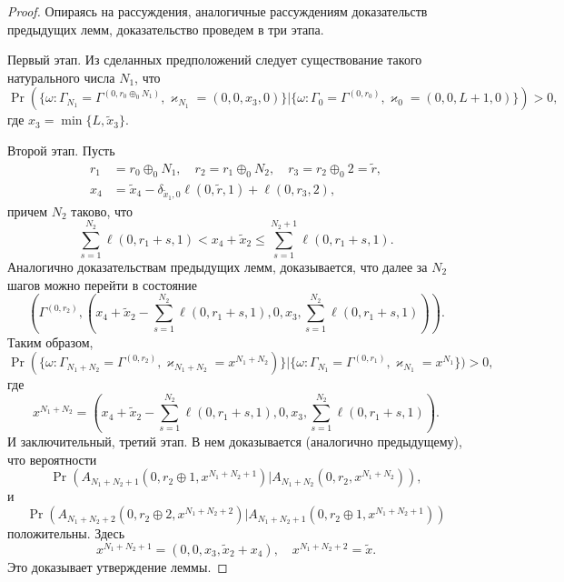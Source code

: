 \documentclass[a4paper,12pt,russian]{extarticle}
\begin{document}
\begin{proof}
Опираясь на рассуждения, аналогичные рассуждениям доказательств предыдущих лемм, доказательство проведем в три этапа.

Первый этап. Из сделанных предположений следует существование такого натурального числа $N_1$, что 
\begin{equation*}
\Pr(\{\omega\colon \Gamma_{N_1}=\Gamma^{(0,r_0\oplus_0 N_1)}, \varkappa_{N_1}=(0,0,x_3,0)\}|\{\omega\colon 
\Gamma_{0}=\Gamma^{(0,r_0)}, \varkappa_{0}=(0,0,L+1,0)\})>0,
\end{equation*}
где $x_3=\min\{L,\tilde{x}_3\}$.

Второй этап. Пусть
\begin{align*}
r_1&=r_0\oplus_0 N_1, \quad r_2=r_1\oplus_0 N_2, \quad r_3=r_2\oplus_0 2 = \tilde{r},\\
x_4&=\tilde{x}_4 - \delta_{\tilde{x}_1,0}\ell(0,\tilde{r},1) + \ell(0,r_3,2),
\end{align*}
причем $N_2$ таково, что 
\begin{equation*}
\sum_{s=1}^{N_2} \ell(0,r_1+s,1) < x_4 + \tilde{x}_2 \leqslant \sum_{s=1}^{N_2+1} \ell(0,r_1+s,1).
\end{equation*}
Аналогично доказательствам предыдущих лемм, доказывается, что далее за $N_2$ шагов можно перейти в состояние 
\begin{equation*}
(\Gamma^{(0,r_2)}, (x_4 + \tilde{x}_2 - \sum_{s=1}^{N_2} \ell(0,r_1+s,1),0,x_3,\sum_{s=1}^{N_2} \ell(0,r_1+s,1))).
\end{equation*}
Таким образом,
\begin{equation*}
\Pr(\{\omega\colon \Gamma_{N_1+N_2}=\Gamma^{(0,r_2)}, \varkappa_{N_1+N_2}=x^{N_1+N_2 })\}|\{\omega\colon 
\Gamma_{N_1}=\Gamma^{(0,r_1)}, \varkappa_{N_1}=x^{N_1}\})>0,
\end{equation*}
где 
\begin{equation*}
x^{N_1+N_2} = (x_4 + \tilde{x}_2 - \sum_{s=1}^{N_2} \ell(0,r_1+s,1),0,x_3,\sum_{s=1}^{N_2} \ell(0,r_1+s,1)).
\end{equation*}
И заключительный, третий этап. В нем доказывается (аналогично предыдущему), что вероятности
\begin{equation*}
\Pr(A_{N_1+N_2+1}(0,r_2\oplus 1,x^{N_1+N_2+1})|A_{N_1+N_2}(0,r_2,x^{N_1+N_2}) ),
\end{equation*}
и 
\begin{equation*}
\Pr(A_{N_1+N_2+2}(0,r_2\oplus 2,x^{N_1+N_2+2})|A_{N_1+N_2+1}(0,r_2\oplus 1,x^{N_1+N_2+1}) )
\end{equation*}
положительны.  Здесь 
\begin{equation*}
x^{N_1+N_2 + 1} = (0,0,x_3,\tilde{x}_2+x_4), \quad x^{N_1+N_2 + 2} = \tilde{x}.
\end{equation*}
Это доказывает утверждение леммы.
\end{proof}
\end{document}
